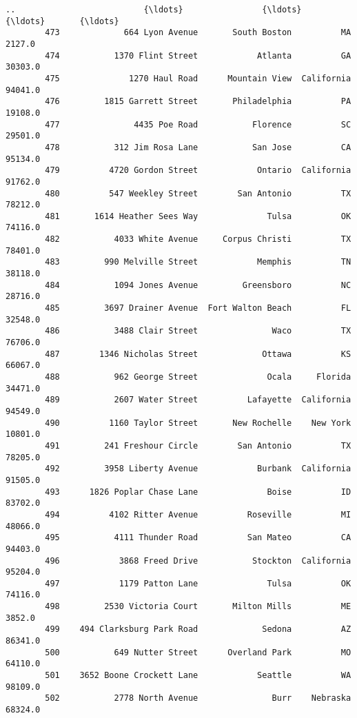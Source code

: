 \documentclass[11pt]{article}
\begin{document}
\begin{Verbatim}[commandchars=\\\{\}]
        ..                          {\ldots}                {\ldots}         {\ldots}       {\ldots}   
        473             664 Lyon Avenue       South Boston          MA    2127.0   
        474           1370 Flint Street            Atlanta          GA   30303.0   
        475              1270 Haul Road      Mountain View  California   94041.0   
        476         1815 Garrett Street       Philadelphia          PA   19108.0   
        477               4435 Poe Road           Florence          SC   29501.0   
        478           312 Jim Rosa Lane           San Jose          CA   95134.0   
        479          4720 Gordon Street            Ontario  California   91762.0   
        480          547 Weekley Street        San Antonio          TX   78212.0   
        481       1614 Heather Sees Way              Tulsa          OK   74116.0   
        482           4033 White Avenue     Corpus Christi          TX   78401.0   
        483         990 Melville Street            Memphis          TN   38118.0   
        484           1094 Jones Avenue         Greensboro          NC   28716.0   
        485         3697 Drainer Avenue  Fort Walton Beach          FL   32548.0   
        486           3488 Clair Street               Waco          TX   76706.0   
        487        1346 Nicholas Street             Ottawa          KS   66067.0   
        488           962 George Street              Ocala     Florida   34471.0   
        489           2607 Water Street          Lafayette  California   94549.0   
        490          1160 Taylor Street       New Rochelle    New York   10801.0   
        491         241 Freshour Circle        San Antonio          TX   78205.0   
        492         3958 Liberty Avenue            Burbank  California   91505.0   
        493      1826 Poplar Chase Lane              Boise          ID   83702.0   
        494          4102 Ritter Avenue          Roseville          MI   48066.0   
        495           4111 Thunder Road          San Mateo          CA   94403.0   
        496            3868 Freed Drive           Stockton  California   95204.0   
        497            1179 Patton Lane              Tulsa          OK   74116.0   
        498         2530 Victoria Court       Milton Mills          ME    3852.0   
        499    494 Clarksburg Park Road             Sedona          AZ   86341.0   
        500           649 Nutter Street      Overland Park          MO   64110.0   
        501    3652 Boone Crockett Lane            Seattle          WA   98109.0   
        502           2778 North Avenue               Burr    Nebraska   68324.0   
        

\end{Verbatim}
\end{document}
